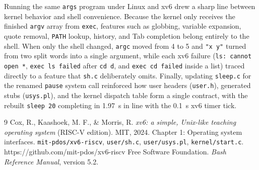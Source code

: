 \documentclass{assets/utmreport}
\begin{document}
Running the same \texttt{args} program under Linux and xv6 drew a sharp line between kernel behavior and shell convenience. Because the kernel only receives the finished \texttt{argv} array from \texttt{exec}, features such as globbing, variable expansion, quote removal, \texttt{PATH} lookup, history, and Tab completion belong entirely to the shell. When only the shell changed, \texttt{argc} moved from 4 to 5 and \texttt{"x y"} turned from two split words into a single argument, while each xv6 failure (\texttt{ls: cannot open *}, \texttt{exec ls failed} after \texttt{cd d}, and \texttt{exec cd failed} inside a list) traced directly to a feature that \texttt{sh.c} deliberately omits. Finally, updating \texttt{sleep.c} for the renamed \texttt{pause} system call reinforced how user headers (\texttt{user.h}), generated stubs (\texttt{usys.pl}), and the kernel dispatch table form a single contract, with the rebuilt \texttt{sleep 20} completing in 1.97~s in line with the 0.1~s xv6 timer tick.

\begin{thebibliography}{9}
 Cox, R., Kaashoek, M. F., \& Morris, R. \textit{xv6: a simple, Unix-like teaching operating system} (RISC-V edition). MIT, 2024. Chapter 1: Operating system interfaces.
 \texttt{mit-pdos/xv6-riscv}, \texttt{user/sh.c}, \texttt{user/usys.pl}, \texttt{kernel/start.c}. https://github.com/mit-pdos/xv6-riscv
 Free Software Foundation. \textit{Bash Reference Manual}, version 5.2.
\end{thebibliography}
\end{document}
